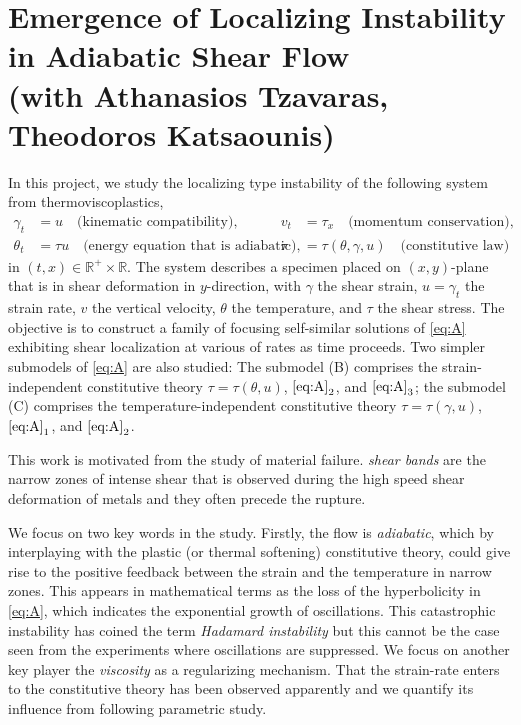 \documentclass[a4paper,11pt]{article}
\begin{document}
\section{Emergence of Localizing Instability in Adiabatic Shear Flow \\{\small(with Athanasios Tzavaras, Theodoros Katsaounis)}}
In this project, we study the {localizing} type instability of the following system from thermoviscoplastics,
\begin{equation} \label{eq:A}\tag{A}
\begin{aligned}
 \gamma_t &= u \quad \text{(kinematic compatibility)}, 	&
 v_t &= \tau_x \quad \text{(momentum conservation)}, 	\\
 \theta_t &= \tau u \quad \text{(energy equation that is adiabatic)},	&
 \tau &=\tau(\theta,\gamma,u) \quad \text{(constitutive law)}			
\end{aligned}
\end{equation}
in $(t,x)\in \mathbb{R}^+\times \mathbb{R}$. The system describes a specimen placed on $(x,y)$-plane that is in shear deformation in $y$-direction, with $\gamma$ the shear strain, $u=\gamma_t$ the strain rate, $v$ the vertical velocity, $\theta$ the temperature, and $\tau$ the shear stress. The objective is to construct a family of focusing self-similar solutions of \eqref{eq:A} exhibiting shear localization at various of rates as time proceeds. Two simpler submodels of \eqref{eq:A} are also studied: The submodel (B) comprises the strain-independent constitutive theory $\tau = \tau(\theta,u)$, $\eqref{eq:A}_2$, and $\eqref{eq:A}_3$; the submodel (C) comprises the temperature-independent constitutive theory $\tau = \tau(\gamma,u)$, $\eqref{eq:A}_1$, and $\eqref{eq:A}_2$.

This work is motivated from the study of material failure. {\it shear bands} are the narrow zones of intense shear that is observed during the high speed shear deformation of metals and they often precede the rupture.

We focus on two key words in the study. Firstly, the flow is {\it adiabatic}, which by interplaying with the {plastic (or thermal softening)} constitutive theory, could give rise to the positive feedback between the strain and the temperature in narrow zones. This appears in mathematical terms as the loss of the hyperbolicity in \eqref{eq:A}, which indicates the exponential growth of oscillations. This catastrophic instability has coined the term {\it Hadamard instability} but this cannot be the case seen from the experiments where oscillations are suppressed. We focus on another key player the {\it viscosity} as a regularizing mechanism. That the strain-rate enters to the constitutive theory has been observed apparently and we quantify its influence from following parametric study.
\end{document}
